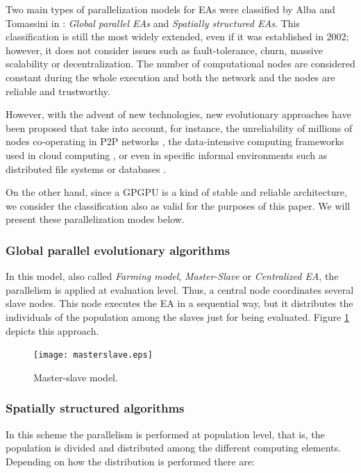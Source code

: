 \documentclass{article}
\begin{document}
Two main types of parallelization models for EAs were classified by Alba and Tomassini in \cite{Alba02Parallelism}: \textit{Global parallel EAs} and
\textit{Spatially structured EAs}. This classification is still the
most widely extended, even if it was established in 2002; however, it
does not consider issues such as fault-tolerance, churn, massive
scalability or decentralization. The number of computational nodes are
considered constant during the whole execution and both the network
and the nodes are reliable and trustworthy. 

However, with the advent of new technologies, new evolutionary approaches have been proposed that take into account, for instance, the unreliability of millions of nodes co-operating in P2P networks \cite{laredo2010evag}, the data-intensive computing frameworks used in cloud computing \cite{VermaCloud10}, or even in specific informal environments such as distributed file systems or databases \cite{Meri_CloudEA13,Merelo_Couch13}.

On the other hand, since a GPGPU is a kind of
stable and reliable architecture, we consider the classification also
as valid for the purposes of this paper. We will present these
parallelization modes below. 

\subsubsection{Global parallel evolutionary algorithms} 
In this model, also called \textit{Farming model},
\textit{Master-Slave} or \textit{Centralized EA}, the parallelism is
applied at evaluation level. Thus, a central node coordinates several
slave nodes. This node executes the EA in a sequential way, but it
distributes the individuals of the population among the slaves just
for being evaluated. Figure \ref{fig:masterslave} depicts this
approach. 

\begin{figure}[tb]
\centering
\texttt{[image: masterslave.eps]}
\caption{Master-slave model.}
\label{fig:masterslave}
\end{figure}

\subsubsection{Spatially structured algorithms}
In this scheme the parallelism is performed at population level, that is, the population is divided and distributed among the different computing elements. Depending on how the distribution is performed there are:
\end{document}
